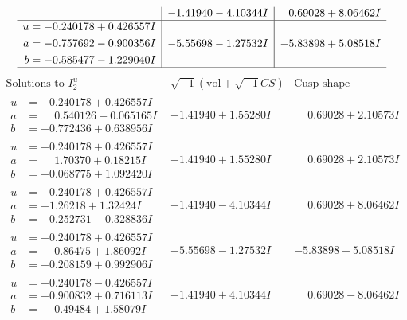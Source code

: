 \documentclass[1p]{elsarticle_modified}
\theoremstyle{definition}
\newcommand{\I}{\sqrt{-1}}
\begin{document}
$$\begin{array}{c|c|c}
 & -1.41940 - 4.10344 I & \phantom{-}0.69028 + 8.06462 I \\ \hline\begin{aligned}
u &= -0.240178 + 0.426557 I \\
a &= -0.757692 - 0.900356 I \\
b &= -0.585477 - 1.229040 I\end{aligned}
 & -5.55698 - 1.27532 I & -5.83898 + 5.08518 I\\
 \hline 
 \end{array}$$\newpage$$\begin{array}{c|c|c}  
\text{Solutions to }I^u_{2}& \I (\text{vol} + \sqrt{-1}CS) & \text{Cusp shape}\\
 \hline 
\begin{aligned}
u &= -0.240178 + 0.426557 I \\
a &= \phantom{-}0.540126 - 0.065165 I \\
b &= -0.772436 + 0.638956 I\end{aligned}
 & -1.41940 + 1.55280 I & \phantom{-}0.69028 + 2.10573 I \\ \hline\begin{aligned}
u &= -0.240178 + 0.426557 I \\
a &= \phantom{-}1.70370 + 0.18215 I \\
b &= -0.068775 + 1.092420 I\end{aligned}
 & -1.41940 + 1.55280 I & \phantom{-}0.69028 + 2.10573 I \\ \hline\begin{aligned}
u &= -0.240178 + 0.426557 I \\
a &= -1.26218 + 1.32424 I \\
b &= -0.252731 - 0.328836 I\end{aligned}
 & -1.41940 - 4.10344 I & \phantom{-}0.69028 + 8.06462 I \\ \hline\begin{aligned}
u &= -0.240178 + 0.426557 I \\
a &= \phantom{-}0.86475 + 1.86092 I \\
b &= -0.208159 + 0.992906 I\end{aligned}
 & -5.55698 - 1.27532 I & -5.83898 + 5.08518 I \\ \hline\begin{aligned}
u &= -0.240178 - 0.426557 I \\
a &= -0.900832 + 0.716113 I \\
b &= \phantom{-}0.49484 + 1.58079 I\end{aligned}
 & -1.41940 + 4.10344 I & \phantom{-}0.69028 - 8.06462 I \\ \hline\begin{aligned}

\end{aligned}
\end{array}$$
\end{document}
